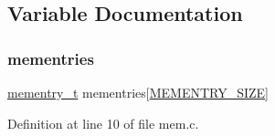 \subsection{Variable Documentation}
\mbox{\label{a00107_a9ec3d7a60bca9bd965aba15905c6d1ed_a9ec3d7a60bca9bd965aba15905c6d1ed}} 
\subsubsection{\texorpdfstring{mementries}{mementries}}
{\footnotesize\ttfamily \hyperlink{a00110_a876b6ee19692762a87e4673911f9b8da_a876b6ee19692762a87e4673911f9b8da}{mementry\+\_\+t} mementries\mbox{[}\hyperlink{a00107_a48623ea6ed429e2f046b49041dde1dc5_a48623ea6ed429e2f046b49041dde1dc5}{M\+E\+M\+E\+N\+T\+R\+Y\+\_\+\+S\+I\+ZE}\mbox{]}}



Definition at line 10 of file mem.\+c.

